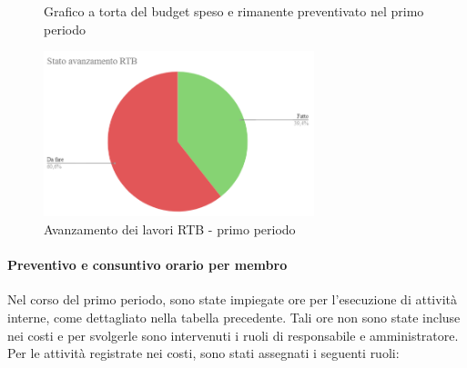 \documentclass{article}
\begin{document}
\begin{figure}[h]
    \centering
    \begin{minipage}[b]{0.45\textwidth}
        \centering
        \caption{Grafico a torta del budget speso e rimanente preventivato nel primo periodo}
        \label{fig:GraficoTorta}
    \end{minipage}

    \vspace{1cm} %

    \begin{minipage}[b]{0.70\textwidth}
        \centering
        \includegraphics[width=0.7\textwidth]{../Images/avanzamento1Periodo.png}
        \caption{Avanzamento dei lavori RTB - primo periodo}
        \label{fig:AvRtb1}
    \end{minipage}
\end{figure}

\paragraph{Preventivo e consuntivo orario per membro}
Nel corso del primo periodo, sono state impiegate ore per l'esecuzione di attività interne, come dettagliato nella tabella precedente. Tali ore non sono state incluse nei costi e per svolgerle sono intervenuti i ruoli di responsabile e amministratore.
Per le attività registrate nei costi, sono stati assegnati i seguenti ruoli:
\end{document}
